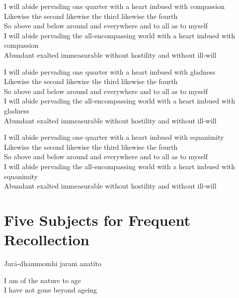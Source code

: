 I will abide pervading one quarter with a heart imbued with compassion\\
Likewise the second likewise the third likewise the fourth\\
So above and below around and everywhere and to all as to myself\\
I will abide pervading the all-encompassing world with a heart imbued with compassion\\
Abundant exalted immeasurable without hostility and without ill-will

I will abide pervading one quarter with a heart imbued with gladness\\
Likewise the second likewise the third likewise the fourth\\
So above and below around and everywhere and to all as to myself\\
I will abide pervading the all-encompassing world with a heart imbued with gladness\\
Abundant exalted immeasurable without hostility and without ill-will

I will abide pervading one quarter with a heart imbued with equanimity\\
Likewise the second likewise the third likewise the fourth\\
So above and below around and everywhere and to all as to myself\\
I will abide pervading the all-encompassing world with a heart imbued with equanimity\\
Abundant exalted immeasurable without hostility and without ill-will

\suttaRef{[DN 13]}


\section{Five Subjects for Frequent Recollection}
\label{five-recollections}

\begin{leader}
\end{leader}

Jarā-dhammomhi jaraṁ anatīto

\begin{english}
  I am of the nature to age\\
  I have not gone beyond ageing
\end{english}


